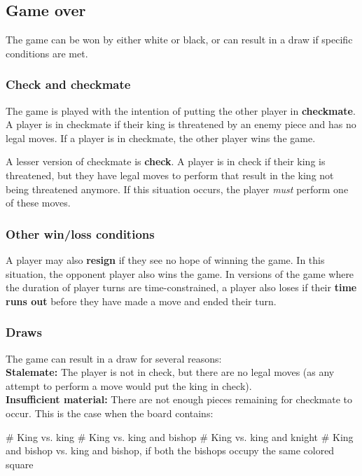 \documentclass{article}
\begin{document}
\subsection*{Game over}

The game can be won by either white or black, or can result in a draw if specific conditions are met.

\subsubsection*{Check and checkmate}

The game is played with the intention of putting the other player in \textbf{checkmate}. A player is in checkmate if their king is threatened by an enemy piece and has no legal moves. If a player is in checkmate, the other player wins the game.

A lesser version of checkmate is \textbf{check}. A player is in check if their king is threatened, but they have legal moves to perform that result in the king not being threatened anymore. If this situation occurs, the player \textit{must} perform one of these moves.

\subsubsection*{Other win/loss conditions}

A player may also \textbf{resign} if they see no hope of winning the game. In this situation, the opponent player also wins the game. In versions of the game where the duration of player turns are time-constrained, a player also loses if their \textbf{time runs out} before they have made a move and ended their turn.

\subsubsection*{Draws}

The game can result in a draw for several reasons:\\

\noindent
\textbf{Stalemate:} The player is not in check, but there are no legal moves (as any attempt to perform a move would put the king in check).\\


\noindent
\textbf{Insufficient material:} There are not enough pieces remaining for checkmate to occur. This is the case when the board contains:

\begin{easylist}[itemize]
# King vs. king
# King vs. king and bishop
# King vs. king and knight
# King and bishop vs. king and bishop, if both the bishops occupy the same colored square
\end{easylist}\mbox{}\\
\end{document}
